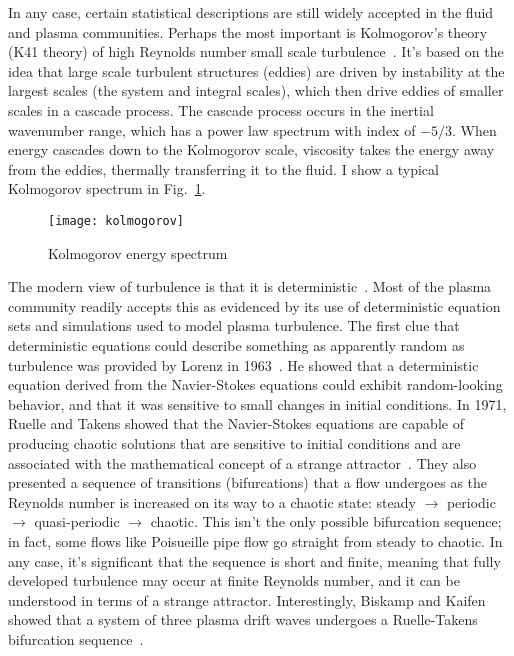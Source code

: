 In any case, certain statistical descriptions are still widely accepted in the fluid and plasma communities. Perhaps the most important is Kolmogorov's theory (K41 theory) of high Reynolds number
small scale turbulence~\cite{Kolmogorov1941,tennekes1972}. 
It's based on the idea that large scale turbulent structures (eddies) are driven by instability at the largest scales (the system and integral scales), 
which then drive eddies of smaller scales in a cascade process. The cascade process occurs in the inertial wavenumber range, which has a power law spectrum with index of $-5/3$. When energy
cascades down to the Kolmogorov scale, viscosity takes the energy away from the eddies, thermally transferring it to the fluid. I show a typical Kolmogorov spectrum in Fig.~\ref{kolmogorov}.

\begin{figure}[!ht]
\centerline{\texttt{[image: kolmogorov]}}
\caption{Kolmogorov energy spectrum}
\label{kolmogorov}
\end{figure}

The modern view of turbulence is that it is deterministic~\cite{mcdonough04}. Most of the plasma community readily accepts this as evidenced by its use of deterministic equation sets and simulations
used to model plasma turbulence. The first clue that deterministic equations could describe something as apparently random as turbulence was provided by Lorenz in 1963~\cite{lorenz1963}.
He showed that a deterministic equation derived from the Navier-Stokes equations could exhibit random-looking behavior, and that it was sensitive to small changes in initial conditions.
In 1971, Ruelle and Takens showed that the Navier-Stokes equations are capable of producing chaotic solutions that are sensitive to initial conditions and are associated with the mathematical
concept of a strange attractor~\cite{ruelle1971,mcdonough04}. They also presented a sequence of transitions (bifurcations) that a flow undergoes as the Reynolds number is increased
on its way to a chaotic state: steady $\rightarrow$ periodic $\rightarrow$ quasi-periodic $\rightarrow$ chaotic. This isn't the only possible bifurcation sequence; 
in fact, some flows like Poisueille pipe flow go straight from steady to chaotic. 
In any case, it's significant that the sequence is short and finite, meaning that fully developed turbulence may occur at finite Reynolds number, and it can be understood in terms
of a strange attractor. Interestingly, Biskamp and Kaifen showed that a system of three plasma drift waves undergoes a Ruelle-Takens bifurcation sequence~\cite{biskamp1985}.

